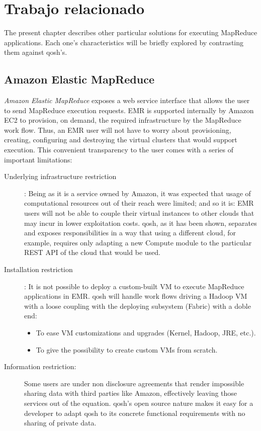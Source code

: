 \chapter{Trabajo relacionado}\label{cap:conclusiones}
\noindent The present chapter describes other particular solutions for executing MapReduce applications. Each one's characteristics will be briefly explored by contrasting them against qosh's.

\section{Amazon Elastic MapReduce}\label{sec:emc}
\noindent \emph{Amazon Elastic MapReduce} \cite{aws} exposes a web service interface that allows the user to send MapReduce execution requests. EMR is supported internally by Amazon EC2 to provision, on demand, the required infrastructure by the MapReduce work flow. Thus, an EMR user will not have to worry about provisioning, creating, configuring and destroying the virtual clusters that would support execution. This convenient transparency to the user comes with a series of important limitations:

\begin{description}
    \item[Underlying infrastructure restriction]: Being as it is a service owned by Amazon, it was expected that usage of computational resources out of their reach were limited; and so it is: EMR users will not be able to couple their virtual instances to other clouds that may incur in lower exploitation costs.
    qosh, as it has been shown, separates and exposes responsibilities in a way that using a different cloud, for example, requires only adapting a new Compute module to the particular REST API of the cloud that would be used.
    \item[Installation restriction]: It is not possible to deploy a custom-built VM to execute MapReduce applications in EMR. qosh will handle work flows driving a Hadoop VM with a loose coupling with the deploying subsystem (Fabric) with a doble end:
    \begin{itemize}
        \item To ease VM customizations and upgrades (Kernel, Hadoop, JRE, etc.).
        \item To give the possibility to create custom VMs from scratch.
    \end{itemize}
    \item[Information restriction:] Some users are under non disclosure agreements that render impossible sharing data with third parties like Amazon, effectively leaving those services out of the equation. qosh's open source nature makes it easy for a developer to adapt qosh to its concrete functional requirements with no sharing of private data.
\end{description}

